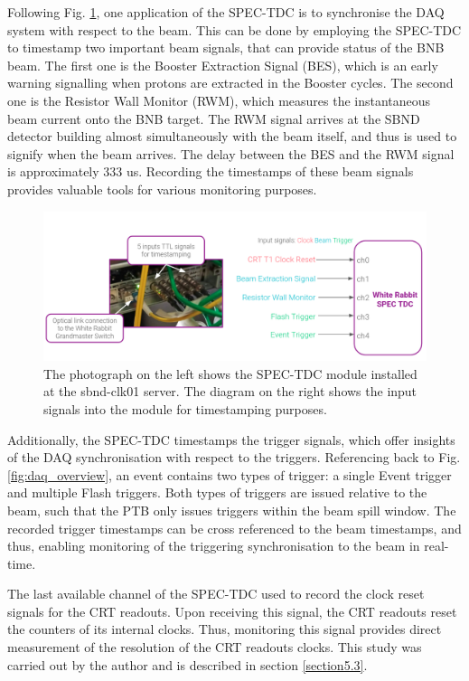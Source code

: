 Following Fig. \ref{fig:SPEC_TDC}, one application of the SPEC-TDC is to synchronise the DAQ system with respect to the beam.
This can be done by employing the SPEC-TDC to timestamp two important beam signals, that can provide status of the BNB beam.
The first one is the Booster Extraction Signal (BES), which is an early warning signalling when protons are extracted in the Booster cycles.
The second one is the Resistor Wall Monitor (RWM), which measures the instantaneous beam current onto the BNB target.
The RWM signal arrives at the SBND detector building almost simultaneously with the beam itself, and thus is used to signify when the beam arrives.
The delay between the BES and the RWM signal is approximately 333 us.
Recording the timestamps of these beam signals provides valuable tools for various monitoring purposes. 

\begin{figure}[htbp!] 
\centering    
\includegraphics[width=1.0\textwidth]{SPEC_TDC}
\caption[SPEC_TDC]{
The photograph on the left shows the SPEC-TDC module installed at the sbnd-clk01 server.
The diagram on the right shows the input signals into the module for timestamping purposes.
}
\label{fig:SPEC_TDC}
\end{figure}

Additionally, the SPEC-TDC timestamps the trigger signals, which offer insights of the DAQ synchronisation with respect to the triggers. 
Referencing back to Fig. \ref{fig:daq_overview}, an event contains two types of trigger: a single Event trigger and multiple Flash triggers. 
Both types of triggers are issued relative to the beam, such that the PTB only issues triggers within the beam spill window.   
The recorded trigger timestamps can be cross referenced to the beam timestamps, and thus, enabling monitoring of the triggering synchronisation to the beam in real-time.

The last available channel of the SPEC-TDC used to record the clock reset signals for the CRT readouts. 
Upon receiving this signal, the CRT readouts reset the counters of its internal clocks.
Thus, monitoring this signal provides direct measurement of the resolution of the CRT readouts clocks.
This study was carried out by the author and is described in section \ref{section5.3}.

